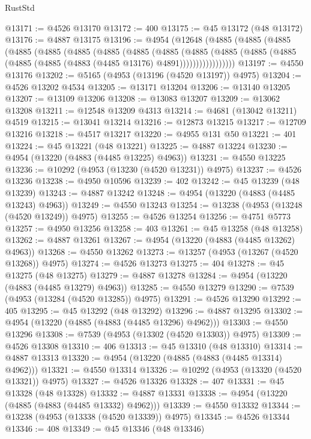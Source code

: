 \begin{lexlean}{RustStd}
\begin{coremodule}
@13171 := @4526 @13170
@13172 := 400
@13175 := @45 @13172 (@48 @13172)
@13176 := @4887 @13175
@13196 := @4954
    (@12648
      (@4885
        (@4885
          (@4885
            (@4885
              (@4885
                (@4885
                  (@4885
                    (@4885
                      (@4885
                        (@4885
                          (@4885
                            (@4885 (@4885 (@4885 (@4885 (@4883 (@4485 @13176) @4891)))))))))))))))))
@13197 := @4550 @13176
@13202 := @5165 (@4953 (@13196 (@4520 @13197)) @4975)
@13204 := @4526 @13202 @4534
@13205 := @13171 @13204
@13206 := @13140 @13205
@13207 := @13109 @13206
@13208 := @13083 @13207
@13209 := @13062 @13208
@13211 := @12548 @13209 @4313
@13214 := @4681 (@13042 @13211) @4519
@13215 := @13041 @13214
@13216 := @12873 @13215
@13217 := @12709 @13216
@13218 := @4517 @13217
@13220 := @4955 @131 @50
@13221 := 401
@13224 := @45 @13221 (@48 @13221)
@13225 := @4887 @13224
@13230 := @4954 (@13220 (@4883 (@4485 @13225) @4963))
@13231 := @4550 @13225
@13236 := @10292 (@4953 (@13230 (@4520 @13231)) @4975)
@13237 := @4526 @13236
@13238 := @4950 @10596
@13239 := 402
@13242 := @45 @13239 (@48 @13239)
@13243 := @4887 @13242
@13248 := @4954 (@13220 (@4883 (@4485 @13243) @4963))
@13249 := @4550 @13243
@13254 := @13238 (@4953 (@13248 (@4520 @13249)) @4975)
@13255 := @4526 @13254
@13256 := @4751 @5773
@13257 := @4950 @13256
@13258 := 403
@13261 := @45 @13258 (@48 @13258)
@13262 := @4887 @13261
@13267 := @4954 (@13220 (@4883 (@4485 @13262) @4963))
@13268 := @4550 @13262
@13273 := @13257 (@4953 (@13267 (@4520 @13268)) @4975)
@13274 := @4526 @13273
@13275 := 404
@13278 := @45 @13275 (@48 @13275)
@13279 := @4887 @13278
@13284 := @4954 (@13220 (@4883 (@4485 @13279) @4963))
@13285 := @4550 @13279
@13290 := @7539 (@4953 (@13284 (@4520 @13285)) @4975)
@13291 := @4526 @13290
@13292 := 405
@13295 := @45 @13292 (@48 @13292)
@13296 := @4887 @13295
@13302 := @4954 (@13220 (@4885 (@4883 (@4485 @13296) @4962)))
@13303 := @4550 @13296
@13308 := @7539 (@4953 (@13302 (@4520 @13303)) @4975)
@13309 := @4526 @13308
@13310 := 406
@13313 := @45 @13310 (@48 @13310)
@13314 := @4887 @13313
@13320 := @4954 (@13220 (@4885 (@4883 (@4485 @13314) @4962)))
@13321 := @4550 @13314
@13326 := @10292 (@4953 (@13320 (@4520 @13321)) @4975)
@13327 := @4526 @13326
@13328 := 407
@13331 := @45 @13328 (@48 @13328)
@13332 := @4887 @13331
@13338 := @4954 (@13220 (@4885 (@4883 (@4485 @13332) @4962)))
@13339 := @4550 @13332
@13344 := @13238 (@4953 (@13338 (@4520 @13339)) @4975)
@13345 := @4526 @13344
@13346 := 408
@13349 := @45 @13346 (@48 @13346)

\end{coremodule}
\end{lexlean}
